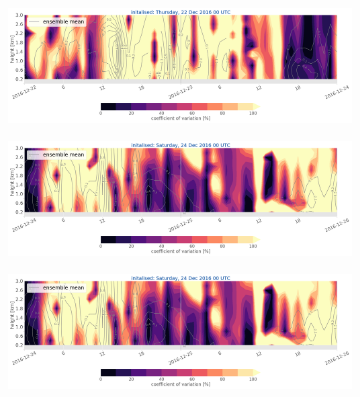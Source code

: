 \begin{figure}[t]\ContinuedFloat
	\begin{subfigure}[t]{\textwidth}		\includegraphics[trim={0.cm 5.3cm 0cm 0cm},clip,width=\textwidth]{./fig_variation/20161222}
		\caption{}\label{fig:ens_vari22}
	\end{subfigure}
	\begin{subfigure}[t]{\textwidth}		\includegraphics[trim={0.cm 5.3cm 0cm 0cm},clip,width=\textwidth]{./fig_variation/20161224}
		\caption{}\label{fig:ens_vari24}
	\end{subfigure}
	
	\begin{subfigure}[t]{\textwidth}		\includegraphics[trim={15.cm 0cm 15cm 21cm},clip,width=\textwidth]{./fig_variation/20161224}
	\end{subfigure}
\end{figure}
